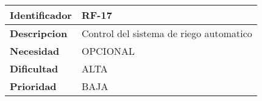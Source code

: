 \begin{center}
    \begin{tabular}{|p{2.6cm}|p{12cm}|}
    \hline
    \textbf{Identificador} & RF-17\\
    \hline
    \textbf{Descripcion} & Control del sistema de riego automatico\\
    \hline
    \textbf{Necesidad} & OPCIONAL\\
    \hline
    \textbf{Dificultad} & ALTA\\
    \hline
    \textbf{Prioridad} & BAJA\\
    \hline
    \end{tabular}
\end{center}

